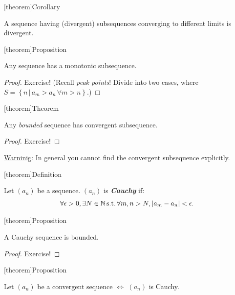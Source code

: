 \documentclass[12pt]{report}
\theoremstyle{definition}
\begin{document}
[theorem]{Corollary}
\begin{divergent subsequence}
    A sequence having (divergent) subsequences converging to different limits is divergent.
\end{divergent subsequence}

[theorem]{Proposition}
\begin{monotonic subsequence}
    Any sequence has a monotonic subsequence.
\end{monotonic subsequence}

\begin{proof}
    Exercise! (Recall \emph{peak points}! Divide into two cases, where
    $S = \left\{n \,|\, a_m > a_n \,\forall m > n\right\} $.)
\end{proof}

[theorem]{Theorem}
\begin{Bolzano-weierstrass}
    Any \emph{bounded} sequence has convergent subsequence.
\end{Bolzano-weierstrass}

\begin{proof}
    Exercise!
\end{proof}

\underline{Warninig}: In general you cannot find the convergent subsequence explicitly.

[theorem]{Definition}
\begin{Cauchy sequence}
    Let $(a_n)$ be a sequence. $(a_n)$ is \textbf{\emph{Cauchy}} if:\[
        \forall \epsilon > 0, \exists N \in \mathbb{N} \,\textnormal{s.t.}\,
        \forall m,n>N, |a_m - a_n| < \epsilon.
    \]
\end{Cauchy sequence}

[theorem]{Proposition}
\begin{Cauchy sequence is bounded}
    A Cauchy sequence is bounded.
\end{Cauchy sequence is bounded}

\begin{proof}
    Exercise!
\end{proof}

[theorem]{Proposition}
\begin{convergent is cauchy}
    Let $(a_n)$ be a convergent sequence $\iff$ $(a_n)$ is Cauchy.
\end{convergent is cauchy}
\end{document}

